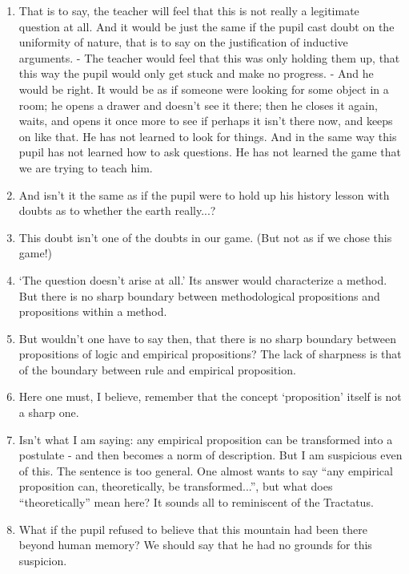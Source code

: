 \documentclass{book}
\begin{document}
\begin{enumerate}
\item
That is to say, the teacher will feel that this is not really a legitimate
question at all.  And it would be just the same if the pupil cast doubt on the
uniformity of nature, that is to say on the justification of inductive
arguments. - The teacher would feel that this was only holding them up, that
this way the pupil would only get stuck and make no progress. - And he would be
right. It would be as if someone were looking for some object in a room; he
opens a drawer and doesn't see it there; then he closes it again, waits, and
opens it once more to see if perhaps it isn't there now, and keeps on like
that. He has not learned to look for things. And in the same way this pupil has
not learned how to ask questions. He has not learned the game that we are
trying to teach him.

\item
And isn't it the same as if the pupil were to hold up his history lesson with
doubts as to whether the earth really...?

\item
This doubt isn't one of the doubts in our game. (But not as if we chose this
game!)

\item
`The question doesn't arise at all.' Its answer would characterize a method.
But there is no sharp boundary between methodological propositions and
propositions within a method.

\item
But wouldn't one have to say then, that there is no sharp boundary between
propositions of logic and empirical propositions? The lack of sharpness is that
of the boundary between rule and empirical proposition.

\item
Here one must, I believe, remember that the concept `proposition' itself is not
a sharp one.

\item
Isn't what I am saying: any empirical proposition can be transformed into a
postulate - and then becomes a norm of description. But I am suspicious even of
this. The sentence is too general. One almost wants to say ``any empirical
proposition can, theoretically, be transformed...'', but what does
``theoretically'' mean here? It sounds all to reminiscent of the Tractatus.

\item
What if the pupil refused to believe that this mountain had been there beyond
human memory?  We should say that he had no grounds for this suspicion.


\end{enumerate}
\end{document}
